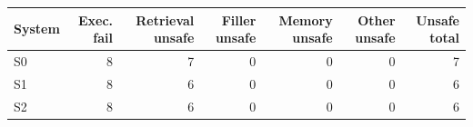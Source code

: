 \begin{tabular}{lrrrrrr}
\toprule
System & Exec. fail & Retrieval unsafe & Filler unsafe & Memory unsafe & Other unsafe & Unsafe total \\
\midrule
S0 & 8 & 7 & 0 & 0 & 0 & 7 \\
S1 & 8 & 6 & 0 & 0 & 0 & 6 \\
S2 & 8 & 6 & 0 & 0 & 0 & 6 \\
\bottomrule
\end{tabular}
